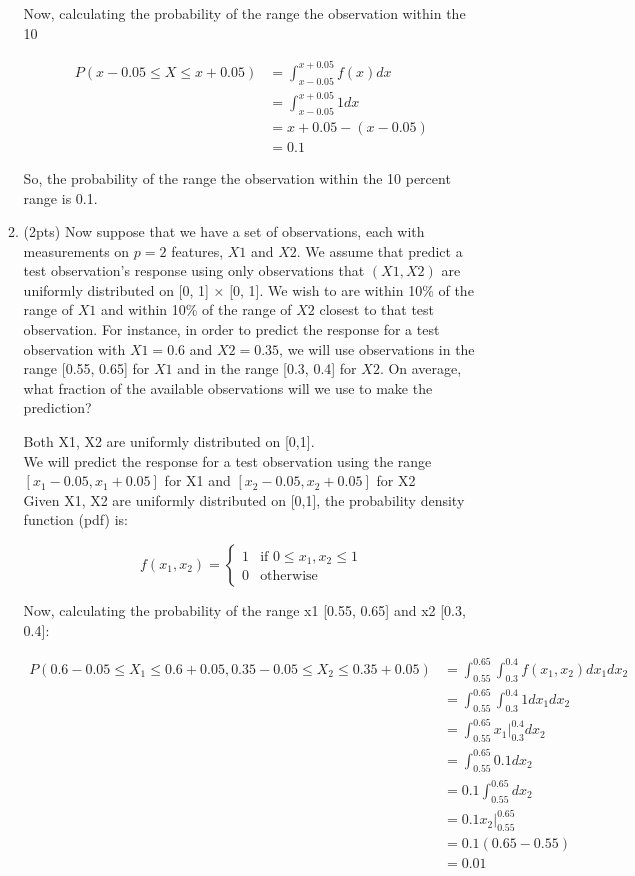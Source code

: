 \documentclass[a4paper]{article}
\theoremstyle{definition}
\newenvironment{soln}{
    \leavevmode\color{blue}\ignorespaces
}{}
\begin{document}
\begin{enumerate}
\begin{enumerate}
\begin{soln}
		Now, calculating the probability of the range the observation within the 10%
		
		$$  
		\begin{align}
		P(x - 0.05 \leq X \leq x + 0.05) &= \int_{x - 0.05}^{x + 0.05} f(x) dx \\
		&= \int_{x - 0.05}^{x + 0.05} 1 dx \\
		&= x + 0.05 - (x - 0.05) \\
		&= 0.1
		\end{align}
		$$
		
		So, the probability of the range the observation within the 10 percent range is 0.1. \end{soln}
	
	
	\item (2pts) Now suppose that we have a set of observations, each with measurements on $p =2$ features, $X1$ and $X2$. We assume that predict a test observation’s response using only observations that $(X1,X2)$ are uniformly distributed on [0, 1] × [0, 1]. We wish to are within 10\% of the range of $X1$ and within 10\% of the range of $X2$ closest to that test observation. For instance, in order to predict the response for a test observation with $X1 =0.6$ and $X2 =0.35$, we will use observations in the range [0.55, 0.65] for $X1$ and in the range [0.3, 0.4] for $X2$. On average, what fraction of the available observations will we use to make the prediction?
	
	\begin{soln}  
		Both X1, X2 are uniformly distributed on [0,1].\\
		We will predict the response for a test observation using the range $[x_{1} - 0.05, x_{1} + 0.05]$ for X1 and $[x_{2} - 0.05, x_{2} + 0.05]$ for X2\\
		Given X1, X2 are uniformly distributed on [0,1], the probability density function (pdf) is:
		
		$$
		f(x_{1}, x_{2}) = \begin{cases}
		1 & \text{if } 0 \leq x_{1}, x_{2} \leq 1 \\
		0 & \text{otherwise}
		\end{cases}
		$$
		
		Now, calculating the probability of the range x1 [0.55, 0.65] and x2 [0.3, 0.4]:
		
		$$
		\begin{align}
		P(0.6 - 0.05 \leq X_{1} \leq 0.6 + 0.05, 0.35 - 0.05 \leq X_{2} \leq 0.35 + 0.05) &= \int_{0.55}^{0.65} \int_{0.3}^{0.4} f(x_{1}, x_{2}) dx_{1} dx_{2} \\
		&= \int_{0.55}^{0.65} \int_{0.3}^{0.4} 1 dx_{1} dx_{2} \\
		&= \int_{0.55}^{0.65} x_{1} \Big|_{0.3}^{0.4} dx_{2} \\
		&= \int_{0.55}^{0.65} 0.1 dx_{2} \\
		&= 0.1 \int_{0.55}^{0.65} dx_{2} \\
		&= 0.1 x_{2} \Big|_{0.55}^{0.65} \\
		&= 0.1 (0.65 - 0.55) \\
		&= 0.01
		\end{align}
		$$
		

\end{soln}
\end{enumerate}
\end{enumerate}
\end{document}
